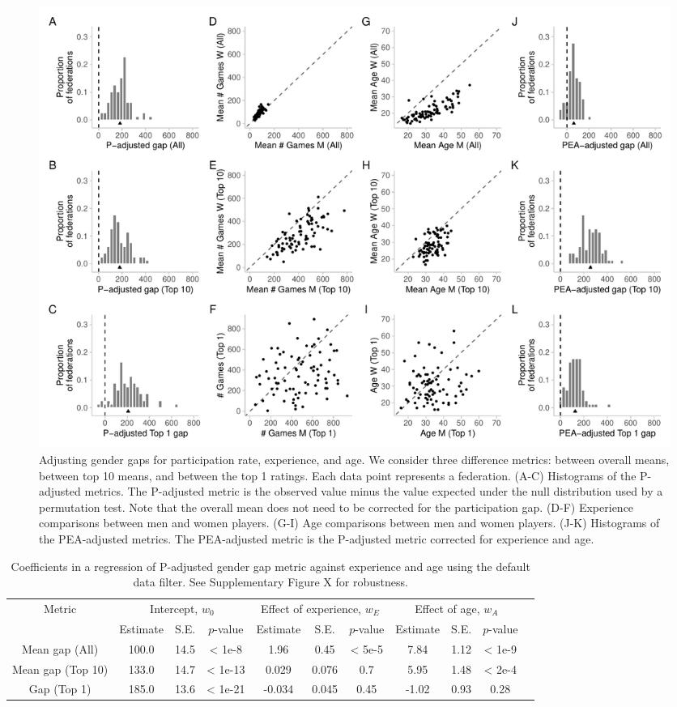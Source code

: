 \documentclass[9pt,twocolumn,twoside,lineno]{pnas-new}
\begin{document}
\begin{figure}[!ht]
    \centering
        \includegraphics[width = \linewidth]{fig_3_w_jun_no_ina.pdf}    
    \caption{Adjusting gender gaps for participation rate, experience, and age. We consider three difference metrics: between overall means, between top 10 means, and between the top 1 ratings. Each data point represents a federation. (A-C) Histograms of the P-adjusted metrics.
 The P-adjusted metric is the observed value minus the value expected under the null distribution used by a permutation test. Note that the overall mean does not need to be corrected for the participation gap. (D-F)  Experience comparisons between men and women players.  (G-I) Age comparisons between men and women players.  (J-K) Histograms of the PEA-adjusted metrics.
 The PEA-adjusted metric is the P-adjusted metric corrected for experience and age.}
    \label{fig:PEA}
\end{figure}

\begin{table}[t!]
\centering
\begin{tabular}{|c|c|c|c|c|c|c|c|c|c|c|}
\hline
\multirow{ 2}{*}{Metric} & \multicolumn{3}{c|}{Intercept, $w_0$} & \multicolumn{3}{c|}{Effect of experience, $w_E$} & \multicolumn{3}{c|}{Effect of age, $w_A$} \\
\cline{2-10}
  & Estimate & S.E. & $p$-value  & Estimate  & S.E. &   $p$-value  & Estimate  & S.E. &   $p$-value \\
\hline
Mean gap (All) & 100.0 & 14.5 & < 1e-8 & 1.96 & 0.45 & < 5e-5 & 7.84 & 1.12 & < 1e-9\\
\hline
Mean gap (Top 10) & 133.0 & 14.7 & < 1e-13 & 0.029 & 0.076 & 0.7 & 5.95 & 1.48 & < 2e-4\\
\hline
Gap (Top 1) & 185.0 & 13.6 & < 1e-21 & -0.034 & 0.045 & 0.45 & -1.02 & 0.93 & 0.28\\
\hline
\end{tabular}
\caption{Coefficients in a regression of P-adjusted gender gap metric against experience and age using the default data filter. See Supplementary Figure X for robustness.} \label{table:weighted-reg}
\end{table}
\end{document}

